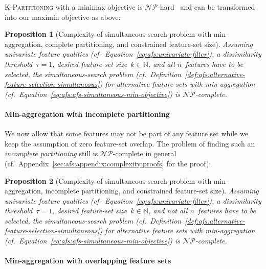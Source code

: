 \documentclass{article}
\newtheorem{proposition}{Proposition}
\theoremstyle{definition}
\begin{document}
\textsc{K-Partitioning} with a minimax objective is $\mathcal{NP}$-hard~\cite{babel1998thek} and
can be transformed into our maximin objective as above:
%
\begin{proposition}[Complexity of simultaneous-search problem with min-aggregation, complete partitioning, and constrained feature-set size]
	Assuming univariate feature qualities (cf.~Equation~\ref{eq:afs:univariate-filter}), a dissimilarity threshold~$\tau = 1$, desired feature-set size~$k \in \mathbb{N}$, and all $n$~features have to be selected, the simultaneous-search problem (cf.~Definition~\ref{def:afs:alternative-feature-selection-simultaneous}) for alternative feature sets with min-aggregation (cf.~Equation~\ref{eq:afs:afs-simultaneous-min-objective}) is $\mathcal{NP}$-complete.
	\label{prop:afs:complexity-partitioning-min-constrained-k}
\end{proposition}

\paragraph{Min-aggregation with incomplete partitioning}

We now allow that some features may not be part of any feature set while we keep the assumption of zero feature-set overlap.
The problem of finding such an \emph{incomplete partitioning} still is $\mathcal{NP}$-complete in general (cf.~Appendix~\ref{sec:afs:appendix:complexity:proofs} for the proof):
%
\begin{proposition}[Complexity of simultaneous-search problem with min-aggregation, incomplete partitioning, and constrained feature-set size]
	Assuming univariate feature qualities (cf.~Equation~\ref{eq:afs:univariate-filter}), a dissimilarity threshold~$\tau = 1$, desired feature-set size~$k \in \mathbb{N}$, and \emph{not} all $n$~features have to be selected, the simultaneous-search problem (cf.~Definition~\ref{def:afs:alternative-feature-selection-simultaneous}) for alternative feature sets with min-aggregation (cf.~Equation~\ref{eq:afs:afs-simultaneous-min-objective}) is $\mathcal{NP}$-complete.
	\label{prop:afs:complexity-incomplete-partitioning-min-constrained-k}
\end{proposition}

\paragraph{Min-aggregation with overlapping feature sets}
\end{document}
